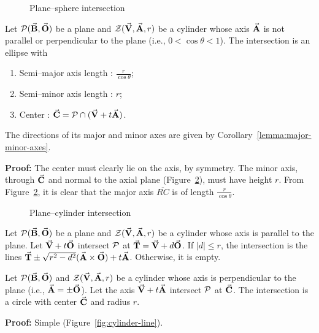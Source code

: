 \begin{figure}
\vspace{3.5cm}
\caption{Plane--sphere intersection}
\label{fig:sphere}
\end{figure}


\begin{theorem}
\label{theorem:cylinder}
Let ${\cal P}(\vec{\bf B},\vec{\bf O})$ be a plane and 
${\cal Z}(\vec{\bf V},\vec{\bf A},r)$ be a cylinder whose axis $\vec{\bf A}$ is
not parallel or perpendicular to the plane (i.e., $0 < \cos \theta < 1$).
The intersection is an ellipse with
\begin{enumerate}
     \item Semi--major axis length    : $\frac{r}{\cos\theta}$;
     \item Semi--minor axis length    : $r$;
     \item Center                     : 
               $\vec{\bf C} = {\cal P}\cap (\vec{\bf V}+t\vec{\bf A})$.
\end{enumerate}
The directions of its major and minor axes are given by 
Corollary~\ref{lemma:major-minor-axes}.
\end{theorem}
{\bf Proof:} The center must clearly lie on the axis, by symmetry.
The minor axis, through $\vec{\bf C}$ and normal to the axial plane 
(Figure~\ref{fig:cylinder}), must have height $r$.
From Figure~\ref{fig:cylinder}, it is clear that the major axis $\overline{RC}$
is of length $\frac{r}{\cos\theta}$.
\QED

\begin{figure}
\vspace{5cm}
\caption{Plane--cylinder intersection}
\label{fig:cylinder}
\end{figure}

\begin{lemma}
     Let ${\cal P}(\vec{\bf B},\vec{\bf O})$ be a plane 
and ${\cal Z}(\vec{\bf V},\vec{\bf A},r)$ be a cylinder whose axis is parallel
to the plane.
Let $\vec{\bf V}+t\vec{\bf O}$ intersect ${\cal P}$ at 
$\vec{\bf T}=\vec{\bf V}+d\vec{\bf O}$.
If $|d| \leq r$, the intersection is the lines
$\vec{\bf T} \pm \sqrt{r^2-d^2}(\vec{\bf A}\times\vec{\bf O})+t\vec{\bf A}$.
Otherwise, it is empty.

Let ${\cal P}(\vec{\bf B},\vec{\bf O})$ and ${\cal Z}(\vec{\bf V},\vec{\bf A},r)$
be a cylinder whose axis is perpendicular to the plane (i.e., 
$\vec{\bf A} = \pm\vec{\bf O}$).  Let the axis $\vec{\bf V}+t\vec{\bf A}$ intersect
${\cal P}$ at $\vec{\bf C}$.  The intersection is a circle with center 
$\vec{\bf C}$ and radius $r$.
\end{lemma}
{\bf Proof:} Simple (Figure~\ref{fig:cylinder-line}). \QED

